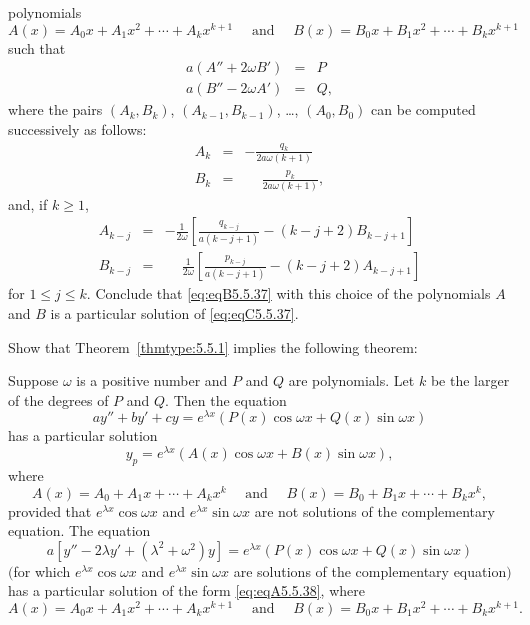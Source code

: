 \documentclass{ximera}
\begin{document}
\begin{problem}
\begin{enumerate}
polynomials
$$
A(x)=A_0x+A_1x^2+\cdots+A_kx^{k+1}\quad \text{ and } \quad
B(x)=B_0x+B_1x^2+\cdots+B_kx^{k+1}
$$
such that
$$
\begin{array}{rcl}
a(A''+2\omega B')&=&P\\ 
a(B''-2\omega A')&=&Q,
\end{array}
$$
where the pairs $(A_k,B_k)$, $(A_{k-1},B_{k-1})$, \dots, $(A_0,B_0)$ can be
computed successively as follows:
\begin{eqnarray*}
A_k&=&-\frac{q_k}{2a\omega(k+1)}\\ 
B_k&=&\phantom{-}\frac{p_k}{2a\omega(k+1)},
\end{eqnarray*}
and, if $k\ge 1$,
\begin{eqnarray*}
A_{k-j}&=&-\frac{1}{2\omega}
\left[\frac{q_{k-j}}{a(k-j+1)}-(k-j+2)B_{k-j+1}\right]\\ 
B_{k-j}&=&\phantom{-}\frac{1}{2\omega}
\left[\frac{p_{k-j}}{a(k-j+1)}-(k-j+2)A_{k-j+1}\right]
\end{eqnarray*}
for $1\le j\le k$.
Conclude that \ref{eq:eqB5.5.37} with this choice of the
polynomials $A$ and $B$ is a particular solution of
\ref{eq:eqC5.5.37}.
\end{enumerate}
\end{problem}

\begin{problem}\label{exer:5.5.38}
Show that  Theorem~\ref{thmtype:5.5.1} implies the following theorem:

Suppose  $\omega$ is a positive  number and $P$ and $Q$
are polynomials. Let $k$ be the larger of the degrees of $P$ and $Q$.
Then the equation
$$
ay''+by'+cy=e^{\lambda x}\left(P(x)\cos \omega x+Q(x)\sin \omega
x\right)
$$
has a particular solution
\begin{equation}\label{eq:eqA5.5.38}
y_p=e^{\lambda x}\left(A(x)\cos\omega x+B(x)\sin\omega x\right),
\end{equation}
where
$$
A(x)=A_0+A_1x+\cdots+A_kx^k \quad \text{ and }\quad
B(x)=B_0+B_1x+\cdots+B_kx^k,
$$
provided that $e^{\lambda x}\cos\omega x$ and $e^{\lambda x}\sin\omega
x$ are not solutions of  the complementary equation. The equation
$$
a\left[y''-2\lambda
y'+(\lambda^2+\omega^2)y\right]=
e^{\lambda x}\left(P(x)\cos \omega x+Q(x)\sin \omega x\right)
$$
$($for which $e^{\lambda x}\cos\omega x$ and $e^{\lambda x}\sin\omega
x$ are
solutions of the complementary equation$)$ has a particular solution
of the form \ref{eq:eqA5.5.38}, where
$$
A(x)=A_0x+A_1x^2+\cdots+A_kx^{k+1} \quad \text{ and }\quad
B(x)=B_0x+B_1x^2+\cdots+B_kx^{k+1}.
$$
\end{problem}
\end{document}
